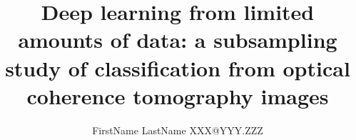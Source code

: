 \documentclass[twoside,11pt]{article}
\begin{document}
\title{Deep learning from limited amounts of data: a subsampling study of classification from optical coherence tomography images}



\author{\name FirstName LastName \email XXX@YYY.ZZZ}

\maketitle









\end{document}
